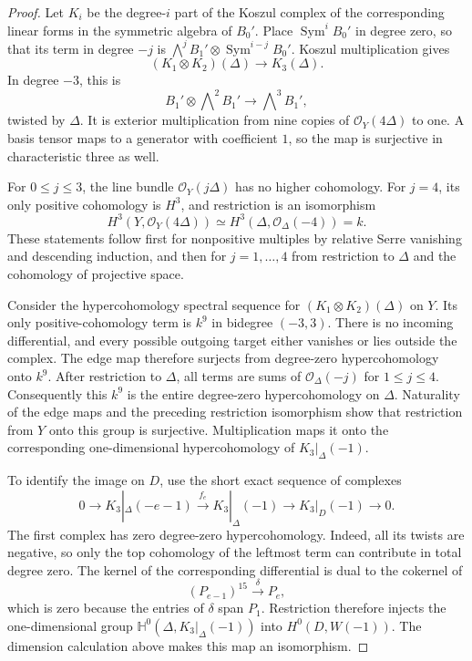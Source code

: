\begin{proof}
Let $K_i$ be the degree-$i$ part of the Koszul complex of the
corresponding linear forms in the symmetric algebra of $B_0'$.
Place $\operatorname{Sym}^iB_0'$ in degree zero, so that its term in
degree $-j$ is
$\bigwedge^jB_1'\otimes\operatorname{Sym}^{i-j}B_0'$.
Koszul multiplication gives
\[
 (K_1\otimes K_2)(\Delta)\longrightarrow K_3(\Delta).
\]
In degree $-3$, this is
\[
 B_1'\otimes\bigwedge\nolimits^2B_1'
 \longrightarrow\bigwedge\nolimits^3B_1',
\]
twisted by $\Delta$.
It is exterior multiplication from nine copies of
$\mathcal O_Y(4\Delta)$ to one.
A basis tensor maps to a generator with coefficient $1$, so the
map is surjective in characteristic three as well.

For $0\le j\le3$, the line bundle $\mathcal O_Y(j\Delta)$ has no
higher cohomology.
For $j=4$, its only positive cohomology is $H^3$, and restriction is
an isomorphism
\[
 H^3(Y,\mathcal O_Y(4\Delta))
   \simeq H^3(\Delta,\mathcal O_\Delta(-4))=k.
\]
These statements follow first for nonpositive multiples by relative
Serre vanishing and descending induction, and then for $j=1,\ldots,4$
from restriction to $\Delta$ and the cohomology of projective space.

Consider the hypercohomology spectral sequence for
$(K_1\otimes K_2)(\Delta)$ on $Y$.
Its only positive-cohomology term is $k^9$ in bidegree $(-3,3)$.
There is no incoming differential, and every possible outgoing
target either vanishes or lies outside the complex.
The edge map therefore surjects from degree-zero hypercohomology
onto $k^9$.
After restriction to $\Delta$, all terms are sums of
$\mathcal O_\Delta(-j)$ for $1\le j\le4$.
Consequently this $k^9$ is the entire degree-zero hypercohomology
on $\Delta$.
Naturality of the edge maps and the preceding restriction
isomorphism show that restriction from $Y$ onto this group is
surjective.
Multiplication maps it onto the corresponding one-dimensional
hypercohomology of $K_3|_\Delta(-1)$.

To identify the image on $D$, use the short exact sequence of
complexes
\[
 0\to K_3|_\Delta(-e-1)
   \xrightarrow{\ f_e\ }K_3|_\Delta(-1)
   \to K_3|_D(-1)\to0.
\]
The first complex has zero degree-zero hypercohomology.
Indeed, all its twists are negative, so only the top cohomology
of the leftmost term can contribute in total degree zero.
The kernel of the corresponding differential is dual to the
cokernel of
\[
 (P_{e-1})^{15}\xrightarrow{\ \delta\ }P_e,
\]
which is zero because the entries of $\delta$ span $P_1$.
Restriction therefore injects the one-dimensional group
$\mathbb H^0(\Delta,K_3|_\Delta(-1))$ into
$H^0(D,W(-1))$.
The dimension calculation above makes this map an isomorphism.


\end{proof}
